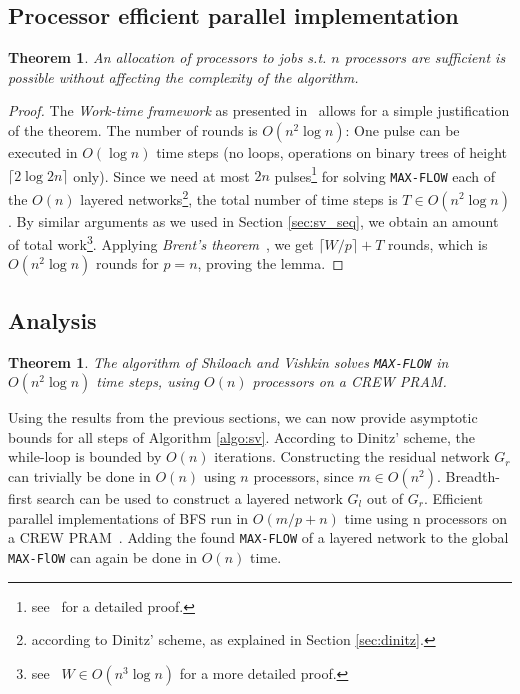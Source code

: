 \documentclass[a4paper,10pt, twocolumn]{article}
\newtheorem{theorem}[lemma]{Theorem}
\begin{document}
\subsection{Processor efficient parallel implementation}
\label{sec:sv_nr_procs}
\begin{theorem}
An allocation of processors to jobs s.t. $n$ processors are sufficient is possible without affecting the complexity of the algorithm. 
\end{theorem}
\begin{proof}
The \emph{Work-time framework} as presented in~\cite{vishkin92} allows for a simple justification of the theorem. The number of rounds is $O(n^2 \log n)$: One pulse can be executed in $O(\log n)$ time steps (no loops, operations on binary trees of height $\lceil 2 \log 2n \rceil$ only). Since we need at most $2n$ pulses\footnote{see~\cite{yossi81} for a detailed proof.} for solving \lstinline|MAX-FLOW| each of the $O(n)$ layered networks\footnote{according to Dinitz' scheme, as explained in Section \ref{sec:dinitz}.}, the total number of time steps is $T \in O(n^{2} \log n)$. By similar arguments as we used in Section \ref{sec:sv_seq}, we obtain an amount of total work\footnote{see~\cite{yossi81} $W \in O(n^{3} \log n)$ for a more detailed proof.}. Applying \emph{Brent's theorem}~\cite{Brent74}, we get $\lceil W/p \rceil + T$ rounds, which is $O(n^{2} \log n)$ rounds for $p=n$, proving the lemma.
\end{proof}

\subsection{Analysis}
\label{sec:sv_analysis}
\begin{theorem}
The algorithm of Shiloach and Vishkin solves \lstinline|MAX-FLOW| in  $O(n^{2} \log n)$ time steps, using $O(n)$ processors on a CREW PRAM.
\end{theorem}

Using the results from the previous sections, we can now provide asymptotic bounds for all steps of Algorithm \ref{algo:sv}. According to Dinitz' scheme, the while-loop is bounded by $O(n)$ iterations. Constructing the residual network $G_r$ can trivially be done in $O(n)$ using $n$ processors, since $m \in O(n^{2})$. Breadth-first search can be used to construct a layered network $G_l$ out of $G_r$. Efficient parallel implementations of BFS run in $O(m/p +n)$ time using n processors on a CREW PRAM~\cite{Varman87}. Adding the found \lstinline|MAX-FLOW| of a layered network to the global \lstinline|MAX-FlOW| can again be done in $O(n)$ time. 
\end{document}

